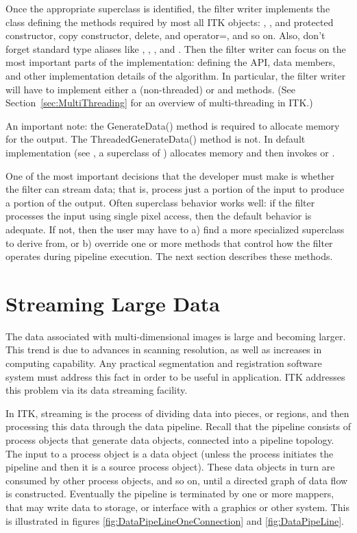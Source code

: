Once the appropriate superclass is identified, the filter writer
implements the class defining the methods required by most all ITK
objects: , , and protected constructor,
copy constructor, delete, and operator=, and so on. Also, don't forget
standard type aliases like , , , and
. Then the filter writer can focus on the most important
parts of the implementation: defining the API, data members, and other
implementation details of the algorithm. In particular, the filter writer
will have to implement either a  (non-threaded) or
 and  methods.
(See Section~\ref{sec:MultiThreading} for an overview of multi-threading in ITK.)

An important note: the GenerateData() method is required to allocate memory
for the output. The ThreadedGenerateData() method is not. In default
implementation (see , a superclass of
)
 allocates memory and then invokes
 or .

One of the most important decisions that the developer must make is whether
the filter can stream data; that is, process just a portion of the input to
produce a portion of the output. Often superclass behavior works well: if the
filter processes the input using single pixel access, then the default
behavior is adequate. If not, then the user may have to a) find a more
specialized superclass to derive from, or b) override one or more methods
that control how the filter operates during pipeline execution. The next
section describes these methods.



\section{Streaming Large Data}
\label{sec:StreamingLargeData}

The data associated with multi-dimensional images is large and becoming larger.
This trend is due to advances in scanning resolution, as well as increases in
computing capability. Any practical segmentation and registration software
system must address this fact in order to be useful in application. ITK
addresses this problem via its data streaming facility.

In ITK, streaming is the process of dividing data into pieces, or regions,
and then processing this data through the data pipeline. Recall that the
pipeline consists of process objects that generate data objects, connected
into a pipeline topology. The input to a process object is a data object
(unless the process initiates the pipeline and then it is a source process
object). These data objects in turn are consumed by other process objects,
and so on, until a directed graph of data flow is constructed. Eventually the
pipeline is terminated by one or more mappers, that may write data to
storage, or interface with a graphics or other system. This is illustrated in
figures \ref{fig:DataPipeLineOneConnection} and \ref{fig:DataPipeLine}.

